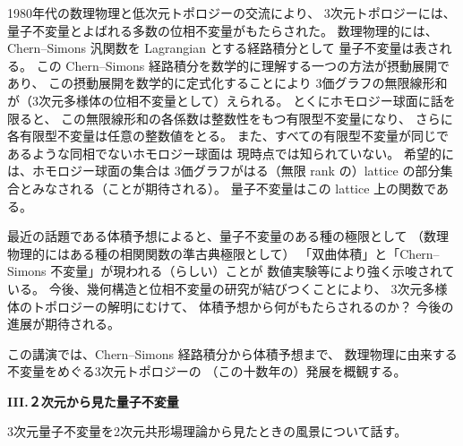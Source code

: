 \documentclass[uplatex,dvipdfmx]{jlreq}
\begin{document}
\bigskip
\hspace*{\fill}{\large\bfseries 大槻　知忠（東工大・情報理工）}

\bigskip

1980年代の数理物理と低次元トポロジーの交流により、
3次元トポロジーには、量子不変量とよばれる多数の位相不変量がもたらされた。
数理物理的には、Chern--Simons 汎関数を Lagrangian とする経路積分として
量子不変量は表される。
この Chern--Simons 経路積分を数学的に理解する一つの方法が摂動展開であり、
この摂動展開を数学的に定式化することにより
3価グラフの無限線形和が（3次元多様体の位相不変量として）えられる。
とくにホモロジー球面に話を限ると、
この無限線形和の各係数は整数性をもつ有限型不変量になり、
さらに各有限型不変量は任意の整数値をとる。
また、すべての有限型不変量が同じであるような同相でないホモロジー球面は
現時点では知られていない。
希望的には、ホモロジー球面の集合は
3価グラフがはる（無限 rank の）lattice の部分集合とみなされる（ことが期待される）。
量子不変量はこの lattice 上の関数である。

最近の話題である体積予想によると、量子不変量のある種の極限として
（数理物理的にはある種の相関関数の準古典極限として）
「双曲体積」と「Chern--Simons 不変量」が現われる（らしい）ことが
数値実験等により強く示唆されている。
今後、幾何構造と位相不変量の研究が結びつくことにより、
3次元多様体のトポロジーの解明にむけて、
体積予想から何がもたらされるのか？ 今後の進展が期待される。

この講演では、Chern--Simons 経路積分から体積予想まで、
数理物理に由来する不変量をめぐる3次元トポロジーの
（この十数年の）発展を概観する。

\newpage

\begin{center}
  {\large\bfseries III.\quad ２次元から見た量子不変量}
\end{center}

\bigskip
\hspace*{\fill}{\large\bfseries 吉田　朋好（東工大・理）}

\bigskip

3次元量子不変量を2次元共形場理論から見たときの風景について話す。
\end{document}
